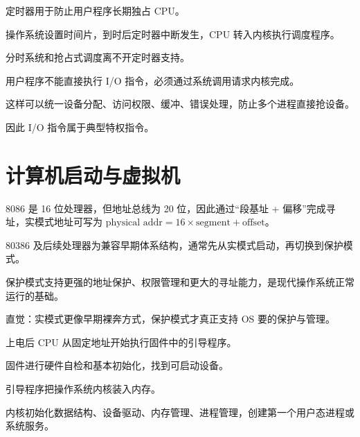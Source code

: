 \begin{points}
  \item 定时器用于防止用户程序长期独占 CPU。
  \item 操作系统设置时间片，到时后定时器中断发生，CPU 转入内核执行调度程序。
  \item 分时系统和抢占式调度离不开定时器支持。
\end{points}


\begin{points}
  \item 用户程序不能直接执行 I/O 指令，必须通过系统调用请求内核完成。
  \item 这样可以统一设备分配、访问权限、缓冲、错误处理，防止多个进程直接抢设备。
  \item 因此 I/O 指令属于典型特权指令。
\end{points}


\section{计算机启动与虚拟机}
\begin{points}
  \item 8086 是 16 位处理器，但地址总线为 20 位，因此通过“段基址 + 偏移”完成寻址，实模式地址可写为 $\text{physical addr}=16\times \text{segment}+\text{offset}$。
  \item 80386 及后续处理器为兼容早期体系结构，通常先从实模式启动，再切换到保护模式。
  \item 保护模式支持更强的地址保护、权限管理和更大的寻址能力，是现代操作系统正常运行的基础。
  \item 直觉：实模式更像早期裸奔方式，保护模式才真正支持 OS 要的保护与管理。
\end{points}


\begin{points}
  \item 上电后 CPU 从固定地址开始执行固件中的引导程序。
  \item 固件进行硬件自检和基本初始化，找到可启动设备。
  \item 引导程序把操作系统内核装入内存。
  \item 内核初始化数据结构、设备驱动、内存管理、进程管理，创建第一个用户态进程或系统服务。
\end{points}


